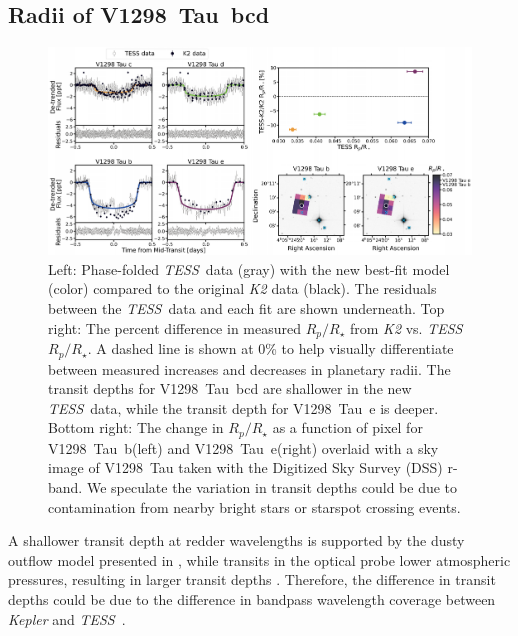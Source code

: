\documentclass[twocolumn]{aastex631}
\newcommand{\githubicon}{{\color{black}\faGithub}}
\newcommand{\tess}{\textit{TESS}}
\newcommand{\sname}{V1298~Tau\xspace}
\newcommand{\planetb}{V1298~Tau~b\xspace}
\newcommand{\planete}{V1298~Tau~e\xspace}
\newcommand{\planetknown}{V1298~Tau~bcd\xspace}
\begin{document}
\subsection{Radii of \planetknown}

\begin{figure}[!htb]
\begin{center}
\includegraphics[width=\textwidth,trim={0.25cm 0 0 0}]{static/compare_together.pdf}
\caption{Left: Phase-folded \tess\ data (gray) with the new best-fit model (color) compared to the original \textit{K2} data (black). The residuals between the \tess\ data and each fit are shown underneath. Top right: The percent difference in measured $R_p/R_\star$ from \textit{K2} vs. \tess\ $R_p/R_\star$. A dashed line is shown at 0\% to help visually differentiate between measured increases and decreases in planetary radii. The transit depths for \planetknown are shallower in the new \tess\ data, while the transit depth for \planete is deeper. Bottom right: The change in $R_p/R_\star$ as a function of pixel for \planetb (left) and \planete (right) overlaid with a sky image of \sname taken with the Digitized Sky Survey (DSS) r-band. We speculate the variation in transit depths could be due to contamination from nearby bright stars or starspot crossing events. \href{https://github.com/afeinstein20/v1298tau_tess/blob/main/src/figures/dilution_check.py}{\githubicon}} \label{fig:compare}
\end{center}
\end{figure}

A shallower transit depth at redder wavelengths is supported by the dusty outflow model presented in \cite{wang19}, while transits in the optical probe lower atmospheric pressures, resulting in larger transit depths \citep{gao20}. Therefore, the difference in transit depths could be due to the difference in bandpass wavelength coverage between \textit{Kepler} \citep[400-900~nm;][]{Howell2014} and \tess\ \citep[600-1000~nm;][]{Ricker2015}. 
\end{document}
